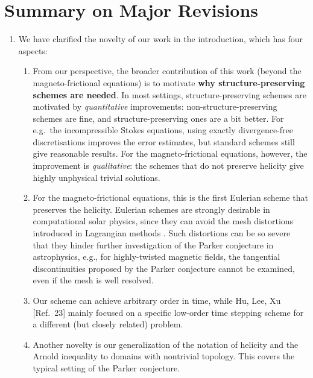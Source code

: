 \documentclass[12pt]{article}
\theoremstyle{definition}
\begin{document}
\section{Summary on Major Revisions}
\begin{enumerate}
    \item We have clarified the novelty of our work in the introduction, which has four aspects:
    \begin{enumerate}
        \item From our perspective, the broader contribution of this work (beyond the magneto-frictional equations) is to motivate \textbf{why structure-preserving schemes are needed}. In most settings, structure-preserving schemes are motivated by \emph{quantitative} improvements: non-structure-preserving schemes are fine, and structure-preserving ones are a bit better. For e.g.~the incompressible Stokes equations, using exactly divergence-free discretisations improves the error estimates, but standard schemes still give reasonable results. For the magneto-frictional equations, however, the improvement is \emph{qualitative}: the schemes that do not preserve helicity give highly unphysical trivial solutions.
        \item For the magneto-frictional equations, this is the first Eulerian scheme that preserves the helicity. Eulerian schemes are strongly desirable in computational solar physics, since they can avoid the mesh distortions introduced in Lagrangian methods \cite{longbottom1998magnetic, craig2005parker, wilmot2009magneticparallel, craig2014current,zhou2016formation, zhou2017constructing}. Such distortions can be so severe that they hinder further investigation of the Parker conjecture in astrophysics, e.g., for highly-twisted magnetic fields, the tangential discontinuities proposed by the Parker conjecture cannot be examined, even if the mesh is well resolved. 
    \item  Our scheme can achieve arbitrary order in time, while Hu, Lee, Xu [Ref.\ 23] mainly focused on a specific low-order time stepping scheme for a different (but closely related) problem. %
    \item Another novelty is our generalization of the notation of helicity and the Arnold inequality to domains with nontrivial topology. This covers the typical setting of the Parker conjecture.    

\end{enumerate}
\end{enumerate}
\end{document}
